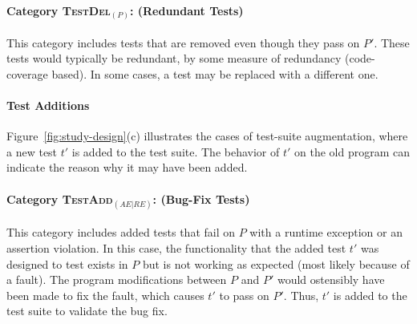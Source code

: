 \documentclass[conference]{IEEEtran}
\newcommand{\subject}[1]{\texttt{\small #1}}
\newcommand{\mt}{\mathit}
\newcommand{\catdelp}{\textsc{TestDel}$_\mt{(P)}$}
\newcommand{\cataddaere}{\textsc{TestAdd}$_\mt{(AE|RE)}$}
\begin{document}
\paragraph{Category \catdelp: (Redundant Tests)}
\label{sec:category-delp}

This category includes tests that are removed even though they pass on
$P'$. These tests would typically be redundant, by some measure of
redundancy (\eg code-coverage based). In some cases, a test may be
replaced with a different one.




\paragraph*{\textbf{Test Additions}}
\label{sec:test-add}

Figure~\ref{fig:study-design}(c) illustrates the cases of test-suite
augmentation, where a new test $t'$ is added to the test suite. The
behavior of $t'$ on the old program can indicate the reason why it may
have been added.

\paragraph{Category \cataddaere: (Bug-Fix Tests)}
\label{sec:category-addaere}

This category includes added tests that fail on $P$ with a runtime
exception or an assertion violation. In this case, the functionality
that the added test $t'$ was designed to test exists in $P$ but is not
working as expected (most likely because of a fault). The program
modifications between $P$ and $P'$ would ostensibly have been made to
fix the fault, which causes $t'$ to pass on $P'$. Thus, $t'$ is added
to the test suite to validate the bug fix.
\end{document}
